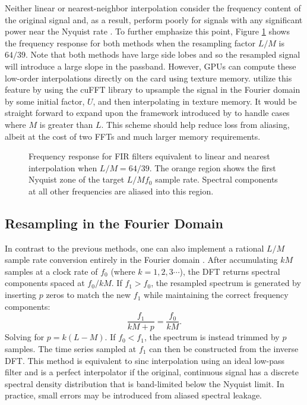 Neither linear or nearest-neighbor interpolation consider the frequency content of the original signal and, as a 
result, perform poorly for signals with any significant power near the Nyquist rate \citep{fraser89}.  To further 
emphasize this point, Figure 
\ref{fig:windows} shows the frequency response for both methods when 
the resampling factor $L/M$ is $64/39$.  Note that both methods have large side lobes and so the 
resampled signal will introduce a large slope in the passband.  However, GPUs can compute 
these low-order interpolations directly on the card using texture memory.  \citet{kim14b} utilize this feature 
by using the cuFFT library to upsample the signal in the Fourier domain by some initial factor, $U$, and then 
interpolating in texture memory.  It would be straight forward to 
expand upon the framework introduced by \citet{kim14b} to handle cases where $M$ is greater than $L$.  
This scheme should help reduce loss from aliasing, albeit 
at the cost of two FFTs and much larger memory requirements.

\begin{figure}[t!]
\caption{Frequency response for FIR filters equivalent to linear and nearest interpolation when $L/M = 64/39$.
The orange region shows the first Nyquist zone of the target $L/Mf_0$ sample rate.  Spectral components at all 
other frequencies are aliased into this region.}
\label{fig:windows}
\end{figure}
 
\subsection{Resampling in the Fourier Domain} \label{sec:fourier_resampling}
In contrast to the previous methods, one can also implement a rational $L/M$ sample rate conversion entirely in 
the Fourier domain \citep{gold69,yeh82}.  After accumulating $kM$ samples at a clock rate of $f_0$ 
(where $k=1,2,3\cdots$), the DFT 
returns spectral components spaced at $f_0/kM$.  If $f_1 > f_0$, the resampled spectrum is generated by inserting
$p$ zeros to match the new $f_1$ while maintaining the correct frequency components: 
\begin{equation}
\frac{f_1}{kM+p} = \frac{f_0}{kM}.
\end{equation} 
Solving for $p = k(L - M)$.  If $f_0 < f_1$, the spectrum is instead trimmed by $p$ samples.  The time series
sampled at $f_1$ can then be constructed from the inverse DFT.  This method is equivalent to sinc 
interpolation using an ideal low-pass filter and is a perfect interpolator
if the original, continuous signal has a discrete spectral density distribution that is band-limited below the 
Nyquist limit.  In practice, small errors may be introduced from aliased spectral leakage. 

